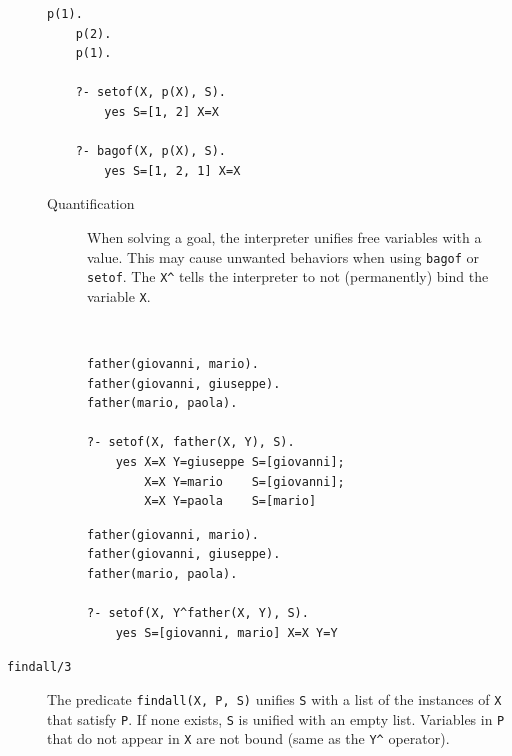 \begin{description}
        \begin{example} \phantom{}
            \begin{lstlisting}[language={}]
    p(1).
    p(2).
    p(1).

    ?- setof(X, p(X), S).
        yes S=[1, 2] X=X

    ?- bagof(X, p(X), S).
        yes S=[1, 2, 1] X=X
            \end{lstlisting}
        \end{example}

        \begin{description}
            \item[Quantification] 
                When solving a goal, the interpreter unifies free variables with a value.
                This may cause unwanted behaviors when using \texttt{bagof} or \texttt{setof}.
                The \texttt{X\textasciicircum} tells the interpreter to not (permanently) bind the variable \texttt{X}.

                \begin{example} \phantom{}\\
                    \begin{minipage}{0.5\textwidth}
                        \begin{lstlisting}[language={}]
father(giovanni, mario).
father(giovanni, giuseppe).
father(mario, paola).

?- setof(X, father(X, Y), S).
    yes X=X Y=giuseppe S=[giovanni];
        X=X Y=mario    S=[giovanni];
        X=X Y=paola    S=[mario]
                        \end{lstlisting}   
                    \end{minipage}
                    \begin{minipage}{0.5\textwidth}
                        \begin{lstlisting}[language={}]
father(giovanni, mario).
father(giovanni, giuseppe).
father(mario, paola).

?- setof(X, Y^father(X, Y), S).
    yes S=[giovanni, mario] X=X Y=Y
                        \end{lstlisting}   
                    \end{minipage}
                \end{example}
        \end{description}

    \item[\texttt{findall/3}] 
        The predicate \texttt{findall(X, P, S)} unifies \texttt{S} with a list of the instances of \texttt{X} that satisfy \texttt{P}.
        If none exists, \texttt{S} is unified with an empty list.
        Variables in \texttt{P} that do not appear in \texttt{X} are not bound (same as the \texttt{Y\textasciicircum} operator).


\end{description}
